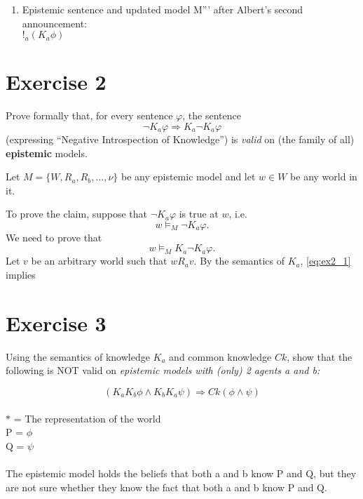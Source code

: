 \documentclass[leqno]{article}
\begin{document}
\begin{enumerate}[label=(\alph*)]
    \item Epistemic sentence and updated model M''' after Albert's second announcement: \\
    $!_a (K_a \phi)$
    \begin{center}
    \end{center}

\end{enumerate}

\section{Exercise 2}
Prove formally that, for every sentence \(\varphi\), the sentence
\[\neg K_{a}\varphi \Rightarrow K_{a}\neg K_{a}\varphi\]
(expressing ``Negative Introspection of Knowledge'') is \textit{valid} on (the family of all) \textbf{epistemic} models.

Let $M = \{W, R_a, R_b, \dots, \nu\}$ be any epistemic model and let $w \in W$ be any world in it.

To prove the claim, suppose that $\neg K_a \varphi$ is true at $w$, i.e.
\begin{equation}
	\tag{1} \label{eq:ex2_1}
	w \models_M \neg K_a \varphi.
\end{equation}
We need to prove that
\begin{equation}
	\tag{?} \label{eq:ex2_?}
	w \models_M K_a \neg K_a \varphi.
\end{equation}
Let $v$ be an arbitrary world such that $w R_a v$.
By the semantics of $K_a$, \eqref{eq:ex2_1} implies


\section{Exercise 3}
Using the semantics of knowledge \(K_{a}\) and common knowledge \(Ck\), show that the following is NOT valid on \textit{epistemic models with (only) 2 agents a and b:}

\[(K_{a}K_{b}\phi\wedge K_{b}K_{a}\psi) \Rightarrow Ck(\phi\wedge\psi)\]
\\
$*$ = The representation of the world \\
P = $ \phi $ \\
Q = $ \psi $ \\
\\
The epistemic model holds the beliefs that both a and b know P and Q, but they are not sure whether they know the fact that both a and b know P and Q.
\end{document}
